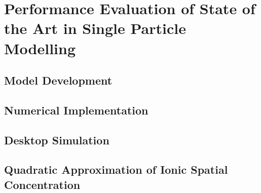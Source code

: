 

\graphicspath{{chapters/spm_analysis/figures/}}

\clearpage
\chapter[SPM Analysis]{Performance Evaluation of State of the Art in Single Particle Modelling}\label{ch:spmanalysis}
\ChapFrame
\startcontents[chapters]

\bigskip


% 

\section{ Model Development}\label{sec:spmmodeldevelopment}



\section{Numerical Implementation}\label{sec:numericalimplementation}


\section{Desktop Simulation}\label{sec:basicspmsimresults}




\section{Quadratic Approximation of Ionic Spatial Concentration}\label{sec:quadraticapprox}


